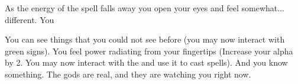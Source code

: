 \documentclass[green]{Emperia}
\begin{document}
\name{\gAwakeningOne{}}

As the energy of the spell falls away you open your eyes and feel somewhat... different. You 

You can see things that you could not see before (you may now interact with green signs).
You feel power radiating from your fingertips (Increase your alpha by 2. You may now interact with the \sBookCover{} and use it to cast spells).
And you know something. The gods are real, and they are watching you right now.
\end{document}
